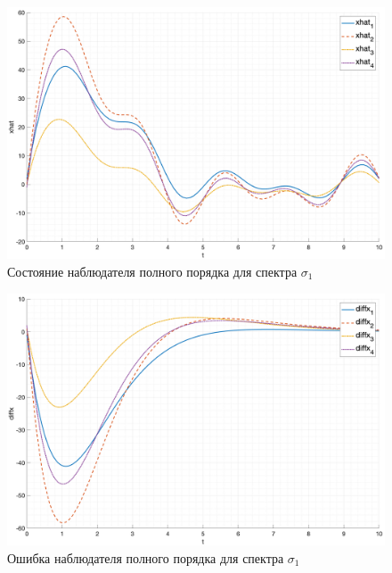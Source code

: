 \begin{figure}[ht!]
    \centering
    \includegraphics[width=\textwidth]{media/plots/task2_xhat_1.png}
    \caption{Состояние наблюдателя полного порядка для спектра $\sigma_1$}
    \label{fig:task2_xhat_1}
\end{figure}

\begin{figure}[ht!]
    \centering
    \includegraphics[width=\textwidth]{media/plots/task2_diffx_1.png}
    \caption{Ошибка наблюдателя полного порядка для спектра $\sigma_1$}
    \label{fig:task2_diff_1}
\end{figure}


